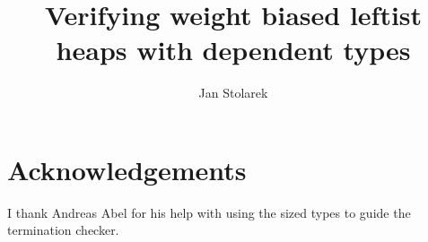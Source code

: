 \documentclass[draft]{llncs}
\begin{document}
\title{Verifying weight biased leftist heaps with dependent types}
\author{Jan Stolarek}



\maketitle







\section*{Acknowledgements}

I thank Andreas Abel for his help with using the sized types to guide the termination checker.


\end{document}
